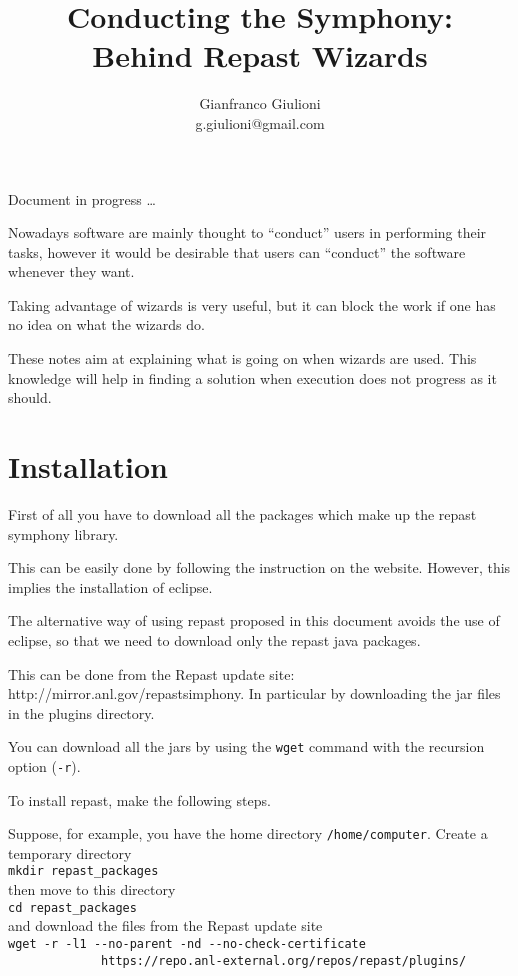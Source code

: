 \documentclass{article}
\title{Conducting the Symphony:\\ Behind Repast Wizards}
\begin{document}
\author{Gianfranco Giulioni\\g.giulioni@gmail.com}
\maketitle

\centerline{\Large Document in progress \ldots}

\vskip1cm
Nowadays software are mainly thought to ``conduct'' users in performing their tasks, however it would be desirable that users can ``conduct'' the software whenever they want. 

Taking advantage of wizards is very useful, but it can block the work if one has no idea on what the wizards do.

These notes aim at explaining what is going on when wizards are used. This knowledge will help in finding a solution when execution does not progress as it should.    


\section{Installation}

First of all you have to download all the packages which make up the repast symphony library. 

This can be easily done by following the instruction on the website. However, this implies the installation of eclipse.

The alternative way of using repast proposed in this document avoids the use of eclipse, so that we need to download only the repast java packages.

This can be done from the Repast update site: http://mirror.anl.gov/repastsimphony. In particular by downloading the jar files in the plugins directory.

You can download all the jars by using the \verb+wget+ command with the recursion option (\verb+-r+).

To install repast, make the following steps.

Suppose, for example, you have the home directory \verb+/home/computer+. Create a temporary directory\\
\verb+mkdir repast_packages+\\
then move to this directory\\
\verb+cd repast_packages+\\
and download the files from the Repast update site\\
\verb+wget -r -l1 --no-parent -nd --no-check-certificate +\\
\verb+             https://repo.anl-external.org/repos/repast/plugins/+\\
\end{document}
